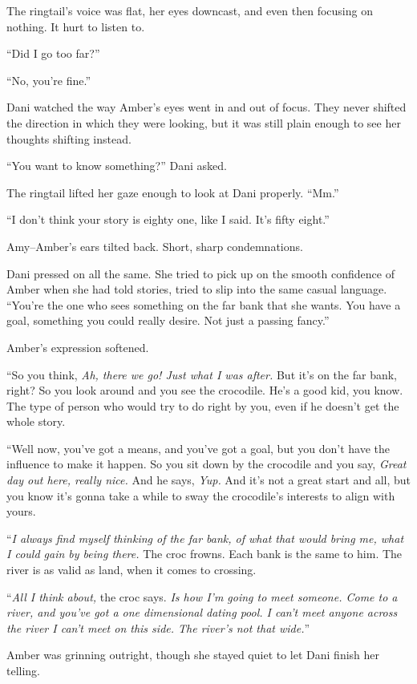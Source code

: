 The ringtail's voice was flat, her eyes downcast, and even then focusing on nothing. It hurt to listen to.

``Did I go too far?''

``No, you're fine.''

Dani watched the way Amber's eyes went in and out of focus. They never shifted the direction in which they were looking, but it was still plain enough to see her thoughts shifting instead.

``You want to know something?'' Dani asked.

The ringtail lifted her gaze enough to look at Dani properly. ``Mm.''

``I don't think your story is eighty one, like I said. It's fifty eight.''

Amy--Amber's ears tilted back. Short, sharp condemnations.

Dani pressed on all the same. She tried to pick up on the smooth confidence of Amber when she had told stories, tried to slip into the same casual language. ``You're the one who sees something on the far bank that she wants. You have a goal, something you could really desire. Not just a passing fancy.''

Amber's expression softened.

``So you think, \emph{Ah, there we go! Just what I was after.} But it's on the far bank, right? So you look around and you see the crocodile. He's a good kid, you know. The type of person who would try to do right by you, even if he doesn't get the whole story.

``Well now, you've got a means, and you've got a goal, but you don't have the influence to make it happen. So you sit down by the crocodile and you say, \emph{Great day out here, really nice.} And he says, \emph{Yup.} And it's not a great start and all, but you know it's gonna take a while to sway the crocodile's interests to align with yours.

``\emph{I always find myself thinking of the far bank, of what that would bring me, what I could gain by being there.} The croc frowns. Each bank is the same to him. The river is as valid as land, when it comes to crossing.

``\emph{All I think about,} the croc says. \emph{Is how I'm going to meet someone. Come to a river, and you've got a one dimensional dating pool. I can't meet anyone across the river I can't meet on this side. The river's not that wide.}''

Amber was grinning outright, though she stayed quiet to let Dani finish her telling.

